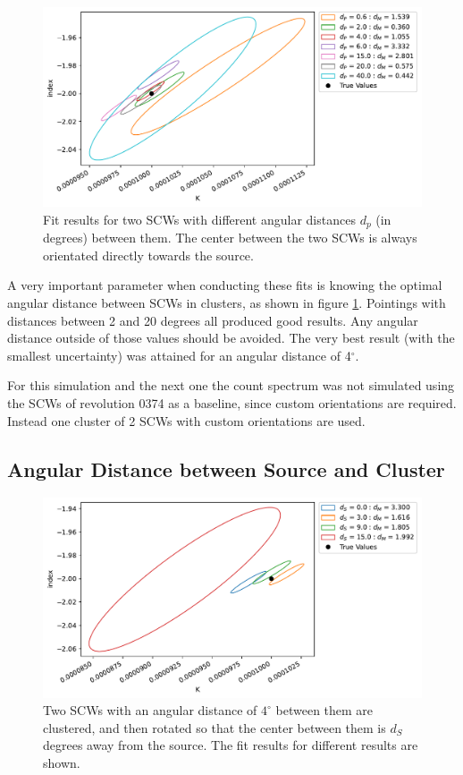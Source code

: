 \documentclass{report}
\begin{document}
\begin{figure}[h]
  \centering
  \includegraphics[width=\textwidth]{Images/Pure_Simulation/combined_plot_pointing_distances.pdf}
  \caption{Fit results for two SCWs with different angular distances $d_p$ (in degrees) between them. The center between the two SCWs is always orientated directly towards the source.}
  \label{fig pointing distances}
\end{figure}

A very important parameter when conducting these fits is knowing the optimal angular distance between SCWs in clusters, as shown in figure \ref{fig pointing distances}. Pointings with distances between 2 and 20 degrees all produced good results. Any angular distance outside of those values should be avoided. The very best result (with the smallest uncertainty) was attained for an angular distance of 4$^\circ$.

For this simulation and the next one the count spectrum was not simulated using the SCWs of revolution 0374 as a baseline, since custom orientations are required. Instead one cluster of 2 SCWs with custom orientations are used.


\subsection{Angular Distance between Source and Cluster}

\begin{figure}[h]
  \centering
  \includegraphics[width=\textwidth]{Images/Pure_Simulation/combined_plot_source_distances.pdf}
  \caption{Two SCWs with an angular distance of $4^\circ$ between them are clustered, and then rotated so that the center between them is $d_S$ degrees away from the source. The fit results for different results are shown.}
  \label{fig source distance}
\end{figure}
\end{document}
